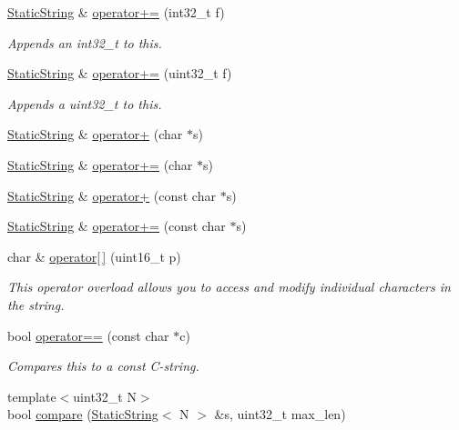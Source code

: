 \begin{DoxyCompactItemize}
\hyperlink{classetk_1_1_static_string}{Static\-String} \& \hyperlink{classetk_1_1_static_string_abbc2d25d1e5fb10024ada928e847dba6}{operator+=} (int32\-\_\-t f)
\begin{DoxyCompactList}\small\item\em Appends an int32\-\_\-t to this. \end{DoxyCompactList}\item 
\hyperlink{classetk_1_1_static_string}{Static\-String} \& \hyperlink{classetk_1_1_static_string_a8bb75ede8fa54143ced44cc04df5a55a}{operator+=} (uint32\-\_\-t f)
\begin{DoxyCompactList}\small\item\em Appends a uint32\-\_\-t to this. \end{DoxyCompactList}\item 
\hyperlink{classetk_1_1_static_string}{Static\-String} \& \hyperlink{classetk_1_1_static_string_abfc7bb9a1599d93a57ff082e3b598401}{operator+} (char $\ast$s)
\item 
\hyperlink{classetk_1_1_static_string}{Static\-String} \& \hyperlink{classetk_1_1_static_string_a8951fba8877efcb79cd492d5b33eebc0}{operator+=} (char $\ast$s)
\item 
\hyperlink{classetk_1_1_static_string}{Static\-String} \& \hyperlink{classetk_1_1_static_string_ad15a9bdbb3ad0933b5425aaa6872bd10}{operator+} (const char $\ast$s)
\item 
\hyperlink{classetk_1_1_static_string}{Static\-String} \& \hyperlink{classetk_1_1_static_string_af9684711c18de43451599bb490fd548b}{operator+=} (const char $\ast$s)
\item 
char \& \hyperlink{classetk_1_1_static_string_a382c19ae16972a29ec1b17e46c1f9a68}{operator\mbox{[}$\,$\mbox{]}} (uint16\-\_\-t p)
\begin{DoxyCompactList}\small\item\em This operator overload allows you to access and modify individual characters in the string. \end{DoxyCompactList}\item 
bool \hyperlink{classetk_1_1_static_string_ac9392fc07494ee308d271717c250d3cf}{operator==} (const char $\ast$c)
\begin{DoxyCompactList}\small\item\em Compares this to a const C-\/string. \end{DoxyCompactList}\item 
{\footnotesize template$<$uint32\-\_\-t N$>$ }\\bool \hyperlink{classetk_1_1_static_string_aa1ec650a682fbbbfe89a625a5e997fb1}{compare} (\hyperlink{classetk_1_1_static_string}{Static\-String}$<$ N $>$ \&s, uint32\-\_\-t max\-\_\-len)

\end{DoxyCompactItemize}
